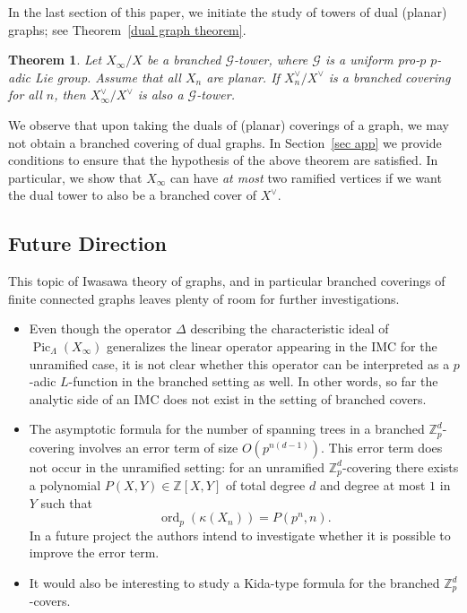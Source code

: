 \documentclass{amsart}
\newtheorem*{theorem*}{Theorem}
\numberwithin{equation}{section}
\theoremstyle{remark}
\newcommand{\Pic}{\operatorname{Pic}}
\newcommand{\ord}{\operatorname{ord}}
\newcommand{\Z}{\mathbb{Z}}
\theoremstyle{plain} %
\begin{document}
In the last section of this paper, we initiate the study of towers of dual (planar) graphs; see Theorem~\ref{dual graph theorem}.

\begin{theorem*}
Let $X_\infty/X$ be a branched $\mathcal{G}$-tower, where $\mathcal{G}$ is a uniform pro-$p$ $p$-adic Lie group.
Assume that all $X_n$ are planar.
If $X_n^\vee/X^\vee$ is a branched covering for all $n$, then $X_\infty^\vee/X^\vee$ is also a $\mathcal{G}$-tower.
\end{theorem*}

{We observe that upon taking the duals of (planar) coverings of a graph, we may not obtain a branched covering of dual graphs.}
In Section~\ref{sec app} we provide conditions to ensure that the hypothesis of the above theorem are satisfied.
{In particular, we show that $X_\infty$ can have \emph{at most} two ramified vertices if we want the dual tower to also be a branched cover of $X^\vee$.}
    
\subsection*{Future Direction}
This topic of Iwasawa theory of graphs, and in particular branched coverings of finite connected graphs leaves plenty of room for further investigations.
\begin{itemize}
\item Even though the operator $\Delta$ describing the characteristic ideal of $\Pic_\Lambda(X_\infty)$ generalizes the linear operator appearing in the IMC for the unramified case, it is not clear whether this operator can be interpreted as a $p$-adic $L$-function in the branched setting as well.
In other words, so far the analytic side of an IMC does not exist in the setting of branched covers.

\item The asymptotic formula for the number of spanning trees in a branched $\Z_p^d$-covering involves an error term of size $O(p^{n(d-1)})$.
This error term does not occur in the unramified setting: for an unramified $\Z_p^d$-covering there exists a polynomial $P(X,Y)\in \Z[X,Y]$ of total degree $d$ and degree at most $1$ in $Y$ such that 
\[
\ord_p(\kappa(X_n))=P(p^n,n).
\]
In a future project the authors intend to investigate whether it is possible to improve the error term.

\item It would also be interesting to study a Kida-type formula for the branched $\Z_p^d$-covers. 
 
\end{itemize}
\end{document}
